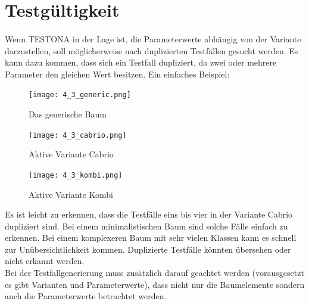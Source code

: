 \newpage
\section{Testgültigkeit}
\paragraph{}
Wenn TESTONA in der Lage ist, die Parameterwerte abhängig von der Variante darzustellen, soll möglicherweise nach duplizierten Testfällen gesucht werden. Es kann dazu kommen, dass sich ein Testfall dupliziert, da zwei oder mehrere Parameter den gleichen Wert besitzen. Ein einfaches Beispiel:\\

\begin{figure}[h!]
  \begin{center}
    \texttt{[image: 4\_3\_generic.png]}
  		  \caption{Das generische Baum}
     \label{ttn.cases_generic}
  \end{center}
\end{figure}

\begin{figure}[h!]
  \begin{center}
    \texttt{[image: 4\_3\_cabrio.png]}
  		  \caption{Aktive Variante Cabrio}
     \label{ttn.cases_cabrio}
  \end{center}
\end{figure}

\begin{figure}[h!]
  \begin{center}
    \texttt{[image: 4\_3\_kombi.png]}
  		  \caption{Aktive Variante Kombi}
     \label{ttn.cases_kombi}
  \end{center}
\end{figure}

Es ist leicht zu erkennen, dass die Testfälle eins bis vier in der Variante \glqq Cabrio\grqq~ dupliziert sind. Bei einem minimalistischen Baum sind solche Fälle einfach zu erkennen. Bei einem komplexeren Baum mit sehr vielen Klassen kann es schnell zur Unübersichtlichkeit kommen. Duplizierte Testfälle könnten übersehen oder nicht erkannt werden.\\

Bei der Testfallgenerierung muss zusätzlich darauf geachtet werden (vorausgesetzt es gibt Varianten und Parameterwerte), dass nicht nur die Baumelemente sondern auch die Parameterwerte betrachtet werden.\\

